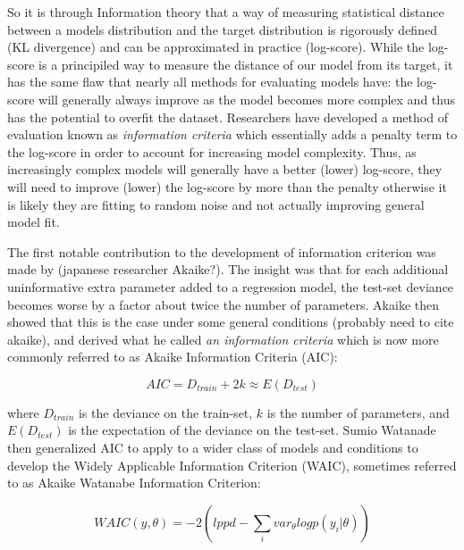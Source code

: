 So it is through Information theory that a way of measuring statistical distance between a models distribution and the target distribution is rigorously defined (KL divergence) and can be approximated in practice (log-score). While the log-score is a principiled way to measure the distance of our model from its target, it has the same flaw that nearly all methods for evaluating models have: the log-score will generally always improve as the model becomes more complex and thus has the potential to overfit the dataset. Researchers have developed a method of evaluation known as \textit{information criteria} which essentially adds a penalty term to the log-score in order to account for increasing model complexity. Thus, as increasingly complex models will generally have a better (lower) log-score, they will need to improve (lower) the log-score by more than the penalty otherwise it is likely they are fitting to random noise and not actually improving general model fit.

The first notable contribution to the development of information criterion was made by (japanese researcher Akaike?). The insight was that for each additional uninformative extra parameter added to a regression model, the test-set deviance becomes worse by a factor about twice the number of parameters. Akaike then showed that this is the case under some general conditions (probably need to cite akaike), and derived what he called \textit{an information criteria} which is now more commonly referred to as Akaike Information Criteria (AIC):

\begin{equation}
AIC = D_{train} + 2k \approx E(D_{test})
\end{equation}

where $D_{train}$ is the deviance on the train-set, $k$ is the number of parameters, and $E(D_{test})$ is the expectation of the deviance on the test-set. Sumio Watanade then generalized AIC to apply to a wider class of models and conditions to develop the Widely Applicable Information Criterion (WAIC), sometimes referred to as Akaike Watanabe Information Criterion:

\begin{equation} \label{eq:waic}
WAIC(y, \theta) = -2 \left( lppd - \sum_i var_{\theta} logp(y_i|\theta) \right)
\end{equation}

